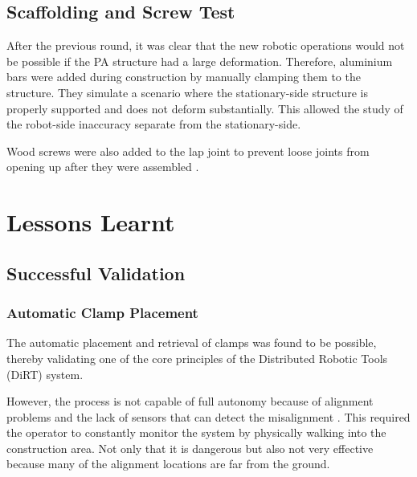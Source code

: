 


\subsection{Scaffolding and Screw Test}
\label{subsection:exploration-3-scaffolding-and-screw-test}

After the previous round, it was clear that the new robotic operations would not be possible if the PA structure had a large deformation. Therefore, aluminium bars were added during construction by manually clamping them to the structure. They simulate a scenario where the stationary-side structure is properly supported and does not deform substantially. This allowed the study of the robot-side inaccuracy separate from the stationary-side.




Wood screws were also added to the lap joint to prevent loose joints from opening up after they were assembled .

\section{Lessons Learnt}
\label{section:exploration-3-lessons-learnt}

\subsection{Successful Validation}
\label{subsection:exploration-3-successful-validation}

\subsubsection{Automatic Clamp Placement}
\label{subsubsection:exploration-3-automatic-clamp-placement}

The automatic placement and retrieval of clamps was found to be possible, thereby validating one of the core principles of the Distributed Robotic Tools (DiRT) system. 

However, the process is not capable of full autonomy because of alignment problems and the lack of sensors that can detect the misalignment . This required the operator to constantly monitor the system by physically walking into the construction area. Not only that it is dangerous but also not very effective because many of the alignment locations are far from the ground. 

